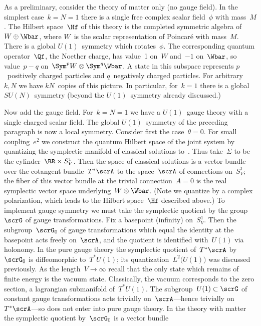 As a preliminary, consider the theory of matter only (no gauge field).  In
the simplest case~$k=N=1$ there is a single free complex scalar field~$\phi $
with mass~$M$.  The Hilbert space~$\Hf$ of this theory is the completed
symmetric algebra of~$W\oplus \Wbar$, where $W$~is the scalar representation
of Poincar\'e with mass~$M$.  There is a global $U(1)$~symmetry which
rotates~$\phi $.  The corresponding quantum operator~$\Qf$, the Noether
charge, has value~1 on~$W$ and~$-1$ on~$\Wbar$, so value~$p-q$
on~$\Sym^pW\otimes \Sym^q\Wbar$.  A state in this subspace represents
$p$~positively charged particles and $q$~negatively charged particles.  For
arbitrary~$k,N$ we have $kN$~copies of this picture.  In particular,
for~$k=1$ there is a global $SU(N)$~symmetry (beyond the $U(1)$~symmetry
already discussed.)
 
Now add the gauge field.  For~$k=N=1$ we have a $U(1)$~gauge theory with a
single charged scalar field.  The global $U(1)$~symmetry of the preceding
paragraph is now a local symmetry.  Consider first the case~$\theta =0$.  For
small coupling~$e^2$ we construct the quantum Hilbert space of the joint
system by quantizing the symplectic manifold of classical solutions
to~.  Thus take~$\Sigma $ to be the cylinder~$\RR\times S^1_V$.
Then the space of classical solutions is a vector bundle over the cotangent
bundle~$T^*\scrA$ to the space~$\scrA$ of connections on~$S^1_V$; the fiber
of this vector bundle at the trivial connection~$A=0$ is the real symplectic
vector space underlying~$W\otimes \Wbar$.  (Note we quantize by a complex
polarization, which leads to the Hilbert space~$\Hf$ described above.)  To
implement gauge symmetry we must take the symplectic quotient by the
group~$\scrG$ of gauge transformations.  Fix a basepoint (infinity)
on~$S^1_V$.  Then the subgroup~$\scrG_0$ of gauge transformations which equal
the identity at the basepoint acts freely on~$\scrA$, and the quotient is
identified with~$U(1)$ via holonomy.  In the pure gauge theory the symplectic
quotient of~$T^*\scrA$ by~$\scrG_0$ is diffeomorphic to~$T^*U(1)$; its
quantization~$L^2\bigl(U(1) \bigr)$ was discussed previously.  As the
length~$V\to\infty $ recall that the only state which remains of finite
energy is the vacuum state.  Classically, the vacuum corresponds to the zero
section, a lagrangian submanifold of~$T^*U(1)$.  The subgroup~$U(1)\subset
\scrG$ of constant gauge transformations acts trivially on~$\scrA$---hence
trivially on~$T^*\scrA$---so does not enter into pure gauge theory.  In the
theory with matter the symplectic quotient by~$\scrG_0$ is a vector bundle
